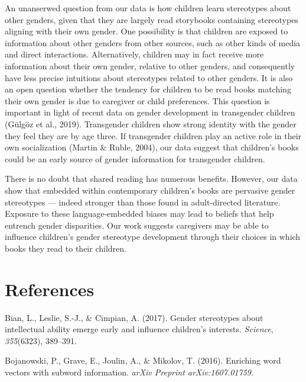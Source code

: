 \documentclass[
  english,
  ,man,floatsintext]{apa6}
\begin{document}
An unanserwed question from our data is how children learn stereotypes about other genders, given that they are largely read storybooks containing stereotypes aligning with their own gender. One possibility is that children are exposed to information about other genders from other sources, such as other kinds of media and direct interactions. Alternatively, children may in fact receive more information about their own gender, relative to other genders, and consequently have less precise intuitions about stereotypes related to other genders. It is also an open question whether the tendency for children to be read books matching their own gender is due to caregiver or child preferences. This question is important in light of recent data on gender development in transgender children (Gülgöz et al., 2019). Transgender children show strong identity with the gender they feel they are by age three. If transgender children play an active role in their own socialization (Martin \& Ruble, 2004), our data suggest that children's books could be an early source of gender information for transgender children.

There is no doubt that shared reading has numerous benefits. However, our data show that embedded within contemporary children's books are pervasive gender stereotypes --- indeed stronger than those found in adult-directed literature. Exposure to these language-embedded biases may lead to beliefs that help entrench gender disparities. Our work suggests caregivers may be able to influence children's gender stereotype development through their choices in which books they read to their children.

\newpage

\hypertarget{references}{%
\section{References}\label{references}}

\setlength{\parindent}{-0.5in}
\setlength{\leftskip}{0.5in}

\hypertarget{refs}{}
\leavevmode\hypertarget{ref-bian2017gender}{}%
Bian, L., Leslie, S.-J., \& Cimpian, A. (2017). Gender stereotypes about intellectual ability emerge early and influence children's interests. \emph{Science}, \emph{355}(6323), 389--391.

\leavevmode\hypertarget{ref-bojanowski2016enriching}{}%
Bojanowski, P., Grave, E., Joulin, A., \& Mikolov, T. (2016). Enriching word vectors with subword information. \emph{arXiv Preprint arXiv:1607.01759}.
\end{document}
